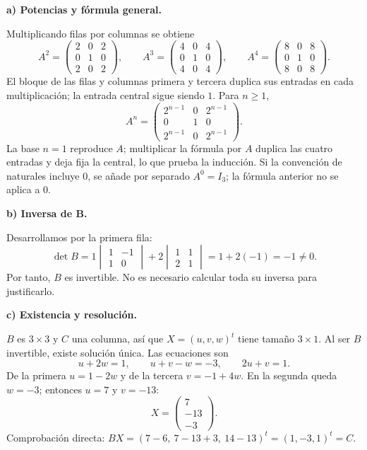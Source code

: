 \textbf{a) Potencias y fórmula general.}\par\nopagebreak[4]
Multiplicando filas por columnas se obtiene
\[
A^2=\begin{pmatrix}2&0&2\\0&1&0\\2&0&2\end{pmatrix},\qquad
A^3=\begin{pmatrix}4&0&4\\0&1&0\\4&0&4\end{pmatrix},\qquad
A^4=\begin{pmatrix}8&0&8\\0&1&0\\8&0&8\end{pmatrix}.
\]
El bloque de las filas y columnas primera y tercera duplica sus entradas en cada multiplicación; la entrada central sigue siendo $1$. Para $n\geq1$,
\[
\boxed{A^n=\begin{pmatrix}2^{n-1}&0&2^{n-1}\\0&1&0\\2^{n-1}&0&2^{n-1}\end{pmatrix}.}
\]
La base $n=1$ reproduce $A$; multiplicar la fórmula por $A$ duplica las cuatro entradas y deja fija la central, lo que prueba la inducción. Si la convención de naturales incluye $0$, se añade por separado $A^0=I_3$; la fórmula anterior no se aplica a $0$.

\textbf{b) Inversa de B.}\par\nopagebreak[4]
Desarrollamos por la primera fila:
\[
\det B=1\begin{vmatrix}1&-1\\1&0\end{vmatrix}
+2\begin{vmatrix}1&1\\2&1\end{vmatrix}=1+2(-1)=-1\ne0.
\]
Por tanto, $B$ es invertible. No es necesario calcular toda su inversa para justificarlo.

\textbf{c) Existencia y resolución.}\par\nopagebreak[4]
$B$ es $3\times3$ y $C$ una columna, así que $X=(u,v,w)^t$ tiene tamaño $3\times1$. Al ser $B$ invertible, existe solución única. Las ecuaciones son
\[
u+2w=1,\qquad u+v-w=-3,\qquad2u+v=1.
\]
De la primera $u=1-2w$ y de la tercera $v=-1+4w$. En la segunda queda $w=-3$; entonces $u=7$ y $v=-13$:
\[
\boxed{X=\begin{pmatrix}7\\-13\\-3\end{pmatrix}.}
\]
Comprobación directa: $BX=(7-6,\ 7-13+3,\ 14-13)^t=(1,-3,1)^t=C$.
